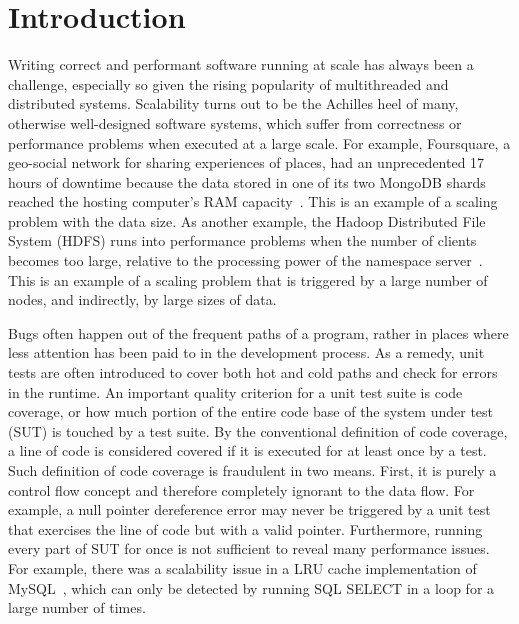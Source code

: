 \section{Introduction}

Writing correct and performant software running at scale has always been a challenge, especially so given the rising popularity of multithreaded and distributed systems.
Scalability turns out to be the Achilles heel of many, otherwise well-designed software systems, which suffer from correctness or performance problems when executed at a large scale.
For example, Foursquare, a geo-social network for sharing experiences of places, had an unprecedented 17 hours of downtime because the data stored in one of its two MongoDB shards reached the hosting computer's RAM capacity~\cite{foursquare-outage}.
This is an example of a scaling problem with the data size.
As another example, the Hadoop Distributed File System (HDFS) runs into performance problems when the number of clients becomes too large, relative to the processing power of the namespace server~\cite{hdfs-scalability}.
This is an example of a scaling problem that is triggered by a large number of nodes, and indirectly, by large sizes of data.

Bugs often happen out of the frequent paths of a program, rather in places where less attention has been paid to in the development process.
As a remedy, unit tests are often introduced to cover both hot and cold paths and check for errors in the runtime.
An important quality criterion for a unit test suite is code coverage, or how much portion of the entire code base of the system under test (SUT) is touched by a test suite.
By the conventional definition of code coverage, a line of code is considered covered if it is executed for at least once by a test.
Such definition of code coverage is fraudulent in two means.
First, it is purely a control flow concept and therefore completely ignorant to the data flow.
For example, a null pointer dereference error may never be triggered by a unit test that exercises the line of code but with a valid pointer.
Furthermore, running every part of SUT for once is not sufficient to reveal many performance issues.
For example, there was a scalability issue in a LRU cache implementation of MySQL~\cite{mysql-49177}, which can only be detected by running SQL SELECT in a loop for a large number of times.


